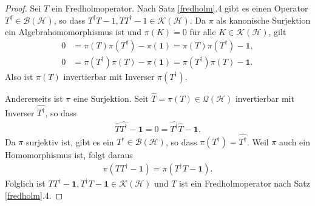 \documentclass[11pt, hidelinks]{article}
\newcommand{\h}{\mathcal{H}}
\numberwithin{conj}{section}
\begin{document}
\begin{proof}
    Sei $T$ ein Fredholmoperator. Nach Satz \ref{fredholm}.4 gibt es einen Operator $T^\dagger \in \mathcal{B}(\h)$, so dass $T^\dagger T - 1, TT^\dagger - 1 \in \mathcal{K}(\h)$. Da $\pi$ als kanonische Surjektion ein Algebrahomomorphismus ist und $\pi(K) = 0$ für alle $K \in \mathcal{K}(\h)$, gilt
    \begin{align}
        0 &= \pi(T)\pi(T^\dagger) - \pi(\mathbf{1}) = \pi(T)\pi(T^\dagger)-\mathbf{1}, \\
        0 &= \pi(T^\dagger)\pi(T)-\pi(\mathbf{1}) = \pi(T^\dagger)\pi(T)-\mathbf{1}.
    \end{align}
    Also ist $\pi(T)$ invertierbar mit Inverser $\pi(T^\dagger)$.

    Andererseits ist $\pi$ eine Surjektion. Seit $\hat{T} = \pi(T) \in \mathcal{Q}(\h)$ invertierbar mit Inverser $\hat{T^\dagger}$, so dass
    \begin{align}
        \hat{T}\hat{T^\dagger} - \mathbf{1} = 0 =\hat{T^\dagger}\hat{T} - \mathbf{1}.
    \end{align}
    Da $\pi$ surjektiv ist, gibt es ein $T^\dagger \in \mathcal{B}(\h)$, so dass $\pi(T^\dagger) = \hat{T^\dagger}$. Weil $\pi$ auch ein Homomorphismus ist, folgt daraus
    \begin{align}
        \pi(TT^\dagger - \mathbf{1}) = \pi(T^\dagger T -\mathbf{1}).
    \end{align}
    Folglich ist $TT^\dagger-\mathbf{1}, T^\dagger T -\mathbf{1} \in \mathcal{K}(\h)$ und $T$ ist ein Fredholmoperator nach Satz \ref{fredholm}.4.
\end{proof}
\end{document}
